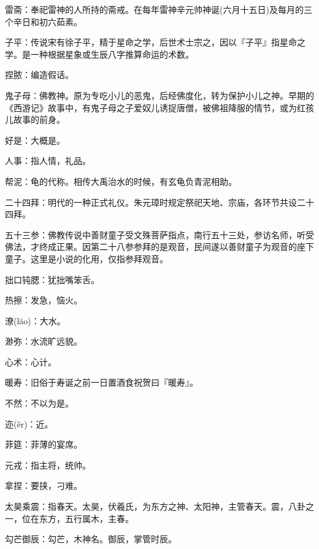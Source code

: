 \startbuffer[1414]
雷斋：奉祀雷神的人所持的斋戒。在每年雷神辛元帅神诞(六月十五日)及每月的三个辛日和初六茹素。
\stopbuffer


\startbuffer[1415]
子平：传说宋有徐子平，精于星命之学，后世术士宗之，因以『子平』指星命之学。是一种根据星象或生辰八字推算命运的术数。
\stopbuffer


\startbuffer[1416]
捏脓：编造假话。
\stopbuffer


\startbuffer[1417]
鬼子母：佛教神。原为专吃小儿的恶鬼，后经佛度化，转为保护小儿之神。早期的《西游记》故事中，有鬼子母之子爱奴儿诱捉唐僧，被佛祖降服的情节，或为红孩儿故事的前身。
\stopbuffer


\startbuffer[1418]
好是：大概是。
\stopbuffer


\startbuffer[1419]
人事：指人情，礼品。
\stopbuffer


\startbuffer[1420]
帮泥：龟的代称。相传大禹治水的时候，有玄龟负青泥相助。
\stopbuffer


\startbuffer[1421]
二十四拜：明代的一种正式礼仪。朱元璋时规定祭祀天地、宗庙，各环节共设二十四拜。
\stopbuffer


\startbuffer[1422]
五十三参：佛教传说中善财童子受文殊菩萨指点，南行五十三处，参访名师，听受佛法，才终成正果。因第二十八参参拜的是观音，民间遂以善财童子为观音的座下童子。这里是小说的化用，仅指参拜观音。
\stopbuffer


\startbuffer[1423]
拙口钝腮：犹拙嘴笨舌。
\stopbuffer


\startbuffer[1424]
热擦：发急，恼火。
\stopbuffer


\startbuffer[1425]
潦(lăo)：大水。
\stopbuffer


\startbuffer[1426]
渺弥：水流旷远貌。
\stopbuffer


\startbuffer[1427]
心术：心计。
\stopbuffer


\startbuffer[1428]
暖寿：旧俗于寿诞之前一日置酒食祝贺曰『暖寿』。
\stopbuffer


\startbuffer[1429]
不然：不以为是。
\stopbuffer


\startbuffer[1430]
迩(ěr)：近。
\stopbuffer


\startbuffer[1431]
菲筵：菲薄的宴席。
\stopbuffer


\startbuffer[1432]
元戎：指主将，统帅。
\stopbuffer


\startbuffer[1433]
拿捏：要挟，刁难。
\stopbuffer


\startbuffer[1434]
太昊乘震：指春天。太昊，伏羲氏，为东方之神、太阳神，主管春天。震，八卦之一，位在东方，五行属木，主春。
\stopbuffer


\startbuffer[1435]
勾芒御辰：勾芒，木神名。御辰，掌管时辰。
\stopbuffer


